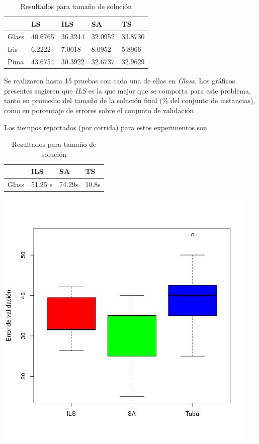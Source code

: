 \documentclass[11pt]{article}
\begin{document}
\begin{table}[h]
\begin{tabular}{ |l|l|l|l|l| }
    \hline
     & LS & ILS & SA & TS  \\ \hline
    Glass & 40.6765 & 36.3244    & 32.0952 & 33.8730 \\ \hline
    Iris  & 6.2222 & 7.0018     & 8.0952  & 5.8966 \\ \hline
    Pima  & 43.6754 & 30.3922 & 32.6737       & 32.9629 \\ \hline
\end{tabular}
\caption{Resultados para tamaño de solución}
\label{tabla:2}
\end{table}


Se realizaron 
hasta 15 pruebas con cada una de ellas en \emph{Glass}. Los gráficos 
presentes sugieren que \emph{ILS} es la que mejor que se comporta para este problema, 
tanto en promedio del tamaño de la solución final (\% del conjunto de instancias), 
como en porcentaje de errores sobre el conjunto de validación.

Los tiempos reportados (por corrida) para estos experimentos son

\begin{table}[h]
\begin{tabular}{ |l|l|l|l| }
    \hline
     & ILS & SA & TS  \\ \hline
    Glass & 51.25 s & 74.29s & 10.8s\\ \hline
\end{tabular}
\caption{Resultados para tamaño de solución}
\label{tabla:2}
\end{table}


\begin{center}
  \includegraphics[scale=0.4]{val_errors.jpeg}~\\[1cm]
\end{center}
\end{document}
